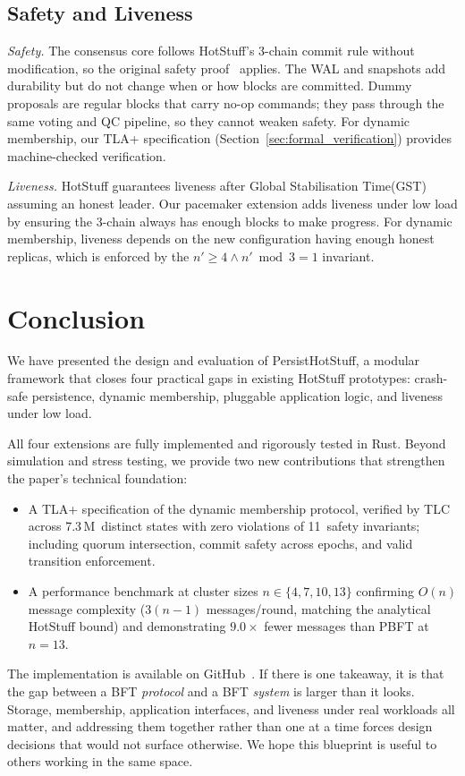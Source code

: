 \documentclass{SVProc}
\begin{document}
\subsection{Safety and Liveness}

\textit{Safety.} The consensus core follows HotStuff's 3-chain commit rule without modification, so the original safety proof~\cite{hotstuff2019} applies.  The WAL and snapshots add durability but do not change when or how blocks are committed.  Dummy proposals are regular blocks that carry no-op commands; they pass through the same voting and QC pipeline, so they cannot weaken safety. For dynamic membership, our TLA+ specification (Section~\ref{sec:formal_verification}) provides machine-checked verification.

\textit{Liveness.}  HotStuff guarantees liveness after Global Stabilisation Time(GST) assuming an honest leader. Our pacemaker extension adds liveness under low load by ensuring the 3-chain always has enough blocks to make progress. For dynamic membership, liveness depends on the new configuration having enough honest replicas, which is enforced by the $n' \ge 4 \wedge n' \bmod 3 = 1$ invariant.



\section{Conclusion}
\label{sec:conclusion}

We have presented the design and evaluation of PersistHotStuff, a modular framework that closes four practical gaps in existing HotStuff prototypes: crash-safe persistence, dynamic membership, pluggable application logic, and liveness under low load.

All four extensions are fully implemented and rigorously tested in Rust.  Beyond simulation and stress testing, we provide two new contributions that strengthen the paper's technical foundation:
\begin{itemize}[itemsep=2pt]
  \item A TLA+ specification of the dynamic membership protocol, verified by TLC across 7.3\,M~distinct states with zero violations of 11~safety invariants; including quorum intersection, commit safety across epochs, and valid transition enforcement.
  \item A performance benchmark at cluster sizes $n \in \{4, 7, 10, 13\}$ confirming $O(n)$ message complexity ($3(n{-}1)$ messages/round, matching the analytical HotStuff bound) and demonstrating $9.0\times$ fewer messages than PBFT at $n{=}13$.
\end{itemize}
The implementation is available on GitHub~\cite {rust-implementation}.
If there is one takeaway, it is that the gap between a BFT
\emph{protocol} and a BFT \emph{system} is larger than it looks.
Storage, membership, application interfaces, and liveness under real workloads all matter, and addressing them together rather than one at a time forces design decisions that would not surface otherwise.  We hope this blueprint is useful to others working in the same space.
\end{document}
